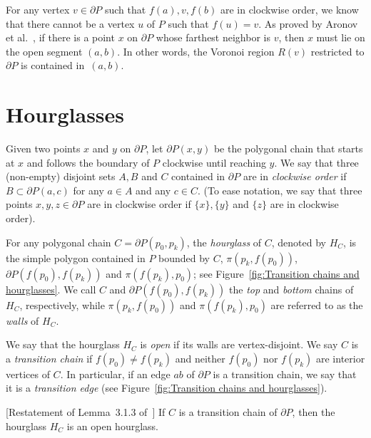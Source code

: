 \documentclass[a4paper,UKenglish]{lipics}
\newcommand{\ff}[1]{\ensuremath{f(#1)}}
\newcommand{\p}[2]{\ensuremath{\pi(#1, #2)}}
\begin{document}
For any vertex $v\in \partial P$ such that  $\ff{a}, v, \ff{b}$ are in clockwise order, we know that there cannot be a vertex $u$ of $P$ such that $\ff{u} = v$.
As proved by Aronov et al.~\cite[Corollary 2.7.4]{aronov1993furthest}, 
if there is a point $x$ on $\partial P$ whose farthest neighbor is $v$, then $x$ must lie on the open segment $(a,b)$. 
In other words, the Voronoi region $R(v)$ restricted to $\partial P$ is contained in~$(a,b)$.


\section{Hourglasses}\label{Section: Building hourglasses}

Given two points $x$ and $y$ on $\partial P$, let $\partial P(x,y)$ be the polygonal chain that starts at $x$ and follows the boundary of $P$ clockwise until reaching $y$.
We say that three (non-empty) disjoint sets $A,B$ and $C$ contained in $\partial P$ are in \emph{clockwise order} if $B\subset \partial P(a,c)$ for any $a\in A$ and any $c\in C$. (To ease notation, we say that three points $x,y,z\in \partial P$ are in clockwise order if $\{x\}, \{y\}$ and $\{z\}$ are in clockwise order).

For any polygonal chain $C= \partial P(p_0, p_k)$, the \emph{hourglass} of $C$, denoted by $H_C$, is the simple polygon contained in $P$ bounded by $C$, $\p{p_k}{\ff{p_0}}$, $\partial P(\ff{p_0}, \ff{p_k})$ and $\p{\ff{p_k}}{ p_0}$; see Figure~\ref{fig:Transition chains and hourglasses}. 
We call $C$ and $\partial P(\ff{p_0}, \ff{p_k})$ the \emph{top} and \emph{bottom} chains of $H_C$, respectively, while $\p{p_k}{ \ff{p_0}}$ and $\p{\ff{p_k}}{p_0}$ are referred to as the \emph{walls} of $H_C$.


We say that the hourglass $H_C$ is \emph{open} if its walls are vertex-disjoint. 
We say $C$ is a \emph{transition chain} if $\ff{p_0} \neq \ff{p_k}$ and neither $\ff{p_0}$ nor $\ff{p_k}$ are interior vertices of $C$. In particular, if an edge $ab$ of $\partial P$ is a transition chain, we say that it is a \emph{transition edge} (see Figure~\ref{fig:Transition chains and hourglasses}).

\begin{lemma}\label{lemma:Transition hourglasses are open}
[Restatement of Lemma~3.1.3 of~\cite{aronov1993furthest}] 
If $C$ is a transition chain of $\partial P$, then the hourglass $H_C$ is an open hourglass.
\end{lemma}
\end{document}
